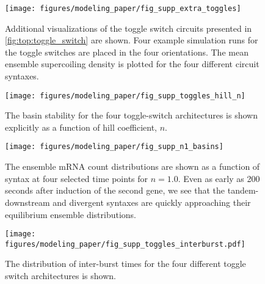 \documentclass[11pt]{article}
\begin{document}
\begin{figure}[hbtp]
    \centering
    {\texttt{[image: figures/modeling\_paper/fig\_supp\_extra\_toggles]}
    \label{fig:supp_toggles_run_examples}
    \label{fig:supp_toggles_mean_sc_density}
    }
    \caption{ Additional visualizations of the toggle switch circuits presented in \cref{fig:top:toggle_switch} are shown.
         Four example simulation runs for the toggle switches are placed in the four orientations. 
         The mean ensemble supercoiling density is plotted for the four different circuit syntaxes.
    }
    \label{fig:supp:toggles_examples_density_interburst}
\end{figure}

\begin{figure}[hbtp]
    \centering
    {\texttt{[image: figures/modeling\_paper/fig\_supp\_toggles\_hill\_n]}
    }
    \caption{The basin stability for the four toggle-switch architectures is shown explicitly as a function of hill coefficient, \(n\).}
    \label{fig:supp:toggles_hill_n_sweep}
\end{figure}


\begin{figure}[hbtp]
    \centering
    \texttt{[image: figures/modeling\_paper/fig\_supp\_n1\_basins]}
    \caption{The ensemble mRNA count distributions are shown as a function of syntax at four selected time points for \(n = 1.0\). Even as early as 200 seconds after induction of the second gene, we see that the tandem-downstream and divergent syntaxes are quickly approaching their equilibrium ensemble distributions.}
    \label{fig:supp:n1_toggle_distributions}
\end{figure}

\begin{figure}[hbtp]
    \centering
    {\texttt{[image: figures/modeling\_paper/fig\_supp\_toggles\_interburst.pdf]}
    }
    \caption{ The distribution of inter-burst times for the four different toggle switch architectures is shown.
    }
    \label{fig:supp_toggles_interburst_time}
\end{figure}
\end{document}
